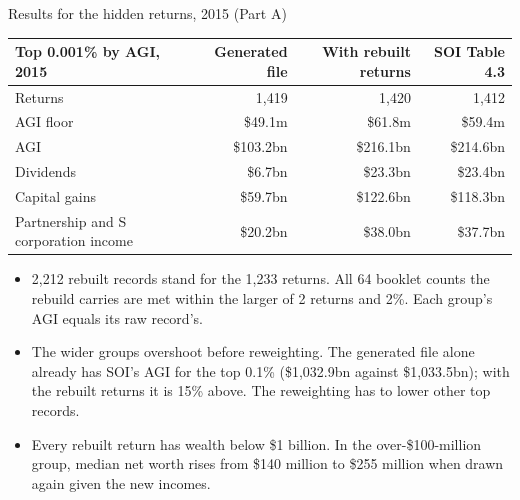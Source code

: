 \begin{frame}{Results for the hidden returns, 2015 (Part A)}
  \footnotesize
  \centering
  \begin{tabular}{lrrr}
    \toprule
    Top 0.001\% by AGI, 2015 & Generated file & With rebuilt returns & SOI Table 4.3 \\
    \midrule
    Returns                  & 1,419     & 1,420     & 1,412 \\
    AGI floor                & \$49.1m   & \$61.8m   & \$59.4m \\
    AGI                      & \$103.2bn & \$216.1bn & \$214.6bn \\
    Dividends                & \$6.7bn   & \$23.3bn  & \$23.4bn \\
    Capital gains            & \$59.7bn  & \$122.6bn & \$118.3bn \\
    Partnership and S corporation income & \$20.2bn & \$38.0bn & \$37.7bn \\
    \bottomrule
  \end{tabular}
  \raggedright
  \begin{itemize}
    \item 2,212 rebuilt records stand for the 1,233 returns. All 64 booklet counts the rebuild carries are
          met within the larger of 2 returns and 2\%. Each group's AGI equals its raw record's.
    \item The wider groups overshoot before reweighting. The generated file alone already has SOI's AGI
          for the top 0.1\% (\$1,032.9bn against \$1,033.5bn); with the rebuilt returns it is 15\% above.
          The reweighting has to lower other top records.
    \item Every rebuilt return has wealth below \$1 billion. In the over-\$100-million group, median net
          worth rises from \$140 million to \$255 million when drawn again given the new incomes.
  \end{itemize}
\end{frame}

